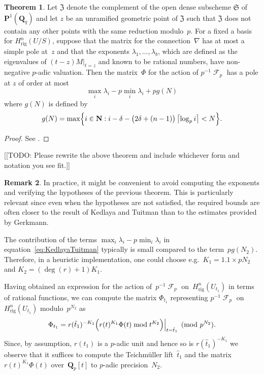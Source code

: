 \documentclass[a4paper,11pt]{article}
\numberwithin{equation}{section}
\providecommand{\ceil}[1]{\left\lceil#1\right\rceil}   %
\DeclareMathOperator{\Frob}{\mathcal{F}} %
\providecommand{\Hrig}{H_{\text{rig}}}  %
\theoremstyle{definition}
\newtheorem{thm}{Theorem}[section]
\newtheorem{rem}[thm]{Remark}
\begin{document}
\begin{thm} \label{thm:KedlayaTuitman}
Let $\mathfrak{Z}$ denote the complement of the open dense 
subscheme $\mathfrak{S}$ of $\mathbf{P}^{1}(\mathbf{Q}_q)$ 
and let $z$ be an unramified geometric point of $\mathfrak{Z}$ 
such that $\mathfrak{Z}$ does not contain any other points 
with the same reduction modulo~$p$.  For a fixed a basis for 
$\Hrig^n(U/S)$, suppose that the matrix 
for the connection~$\nabla$ has at most a simple pole at~$z$ 
and that the exponents $\lambda_1, \dotsc, \lambda_{b}$, 
which are defined as the eigenvalues of $(t - z) M \vert_{t=z}$ 
and known to be rational numbers, have non-negative $p$-adic 
valuation.  Then the matrix~$\Phi$ for the action of $p^{-1} \Frob_p$ 
has a pole at $z$ of order at most 
\begin{equation} \label{eq:KedlayaTuitman}
\max_{i} \lambda_i - p \min_{i} \lambda_i + p g(N)
\end{equation}
where $g(N)$ is defined by 
\begin{equation}
g(N) = \max\Bigl\{ i \in \mathbf{N} : i - \delta - \bigl(2\delta + (n-1)\bigr) \ceil{\log_p i} < N \Bigr\}.
\end{equation}
\end{thm}

\begin{proof}
See \citep[Theorem~2.1]{KedlayaTuitman2012}.
\end{proof}

[[TODO:  Please rewrite the above theorem and include whichever 
form and notation you see fit.]]

\begin{rem} \label{rem:KedlayaTuitman}
In practice, it might be convenient to avoid computing the exponents and 
verifying the hypotheses of the previous theorem.  This is particularly 
relevant since even when the hypotheses are not satisfied, the required 
bounds are often closer to the result of Kedlaya and Tuitman than to the 
estimates provided by Gerkmann.

The contribution of the terms $\max_i \lambda_i - p \min_i \lambda_i$ 
in equation~\eqref{eq:KedlayaTuitman} typically is small compared to the 
term~$p g(N_2)$. Therefore, in a heuristic implementation, one 
could choose e.g.\ $K_1 = 1.1 \times p N_2$ and $K_2 = (\deg(r) + 1) K_1$.
\end{rem}

Having obtained an expression for the action of~$p^{-1} \Frob_p$ 
on~$\Hrig^{n}(U_{t_1})$ in terms of rational functions, we can 
compute the matrix $\Phi_{t_1}$ representing $p^{-1} \Frob_p$ on 
$\Hrig^{n}(U_{t_1})$ modulo~$p^{N_2}$ as 
\begin{equation}
\Phi_{t_1} = 
    r(\hat{t}_1)^{-K_1} 
    \Bigl( r(t)^{K_1} \Phi(t) \bmod{t^{K_2}} \Bigr) \Big\vert_{t=\hat{t}_1} \pmod{p^{N_2}}.
\end{equation}
Since, by assumption, $r(t_1)$ is a $p$-adic unit and hence so is 
$r(\hat{t}_1)^{-K_1}$ we observe that it suffices to compute the 
Teichm\"uller lift~$\hat{t}_1$ and the matrix~$r(t)^{K_1} \Phi(t)$ 
over~$\mathbf{Q}_p[t]$ to $p$-adic precision~$N_2$.
\end{document}
